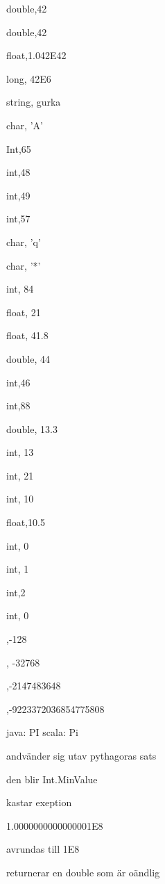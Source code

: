 \Subtask double,42

\Subtask double,42

\Subtask float,1.042E42

\Subtask long, 42E6

\Subtask string, gurka

\Subtask char, 'A'

\Subtask Int,65

\Subtask int,48

\Subtask int,49

\Subtask int,57

\Subtask  char, 'q'

\Subtask  char, '*'

\Task %
\Subtask  int, 84

\Subtask float, 21

\Subtask float, 41.8

\Subtask double, 44

\Task %
\Subtask int,46

\Subtask int,88

\Subtask double, 13.3

\Subtask int, 13

\Task %
\Subtask  int, 21

\Subtask  int, 10

\Subtask float,10.5

\Subtask int, 0

\Subtask int, 1

\Subtask int,2

\Subtask int, 0


\Task %
,-128

, -32768

,-2147483648

,-9223372036854775808

\Task %
\Subtask 
java: PI scala: Pi

\Subtask andvänder sig utav pythagoras sats

\Subtask 

\Task %
\Subtask den blir Int.MinValue

\Subtask kastar exeption

\Subtask 1.0000000000000001E8

\Subtask avrundas till 1E8


\Subtask returnerar en double som är oändlig

